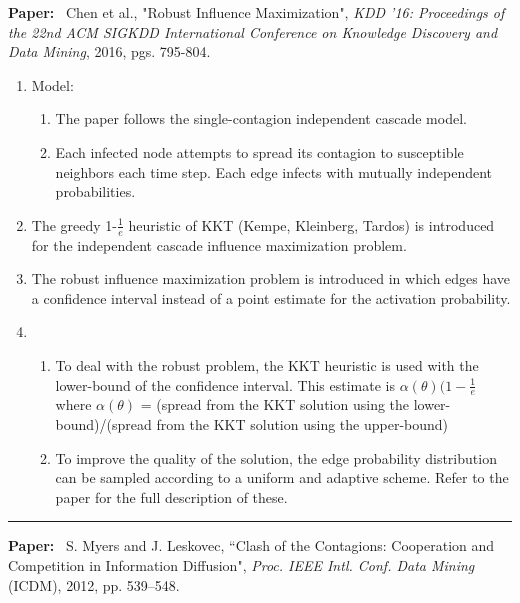 \documentclass[11pt]{article}
\begin{document}
\textbf{Paper:}~
Chen et al., "Robust Influence Maximization", \emph{KDD '16: Proceedings of the 22nd ACM SIGKDD International Conference on Knowledge Discovery and Data Mining}, 2016, pgs. 795-804.
\begin{enumerate}
    \item Model: \begin{enumerate}
        \item The paper follows the single-contagion independent cascade model.
        \item Each infected node attempts to spread its contagion to susceptible neighbors each time step. Each edge infects with mutually independent probabilities.
    \end{enumerate}
    \item The greedy 1-$\frac{1}{e}$ heuristic of KKT (Kempe, Kleinberg, Tardos) is introduced for the independent cascade influence maximization problem. 
    \item The robust influence maximization problem is introduced in which edges have a confidence interval instead of a point estimate for the activation probability.
    \item \begin{enumerate}
        \item To deal with the robust problem, the KKT heuristic is used with the lower-bound of the confidence interval. This estimate is $\alpha(\theta)(1-\frac{1}{e}$ where $\alpha(\theta)$ = (spread from the KKT solution using the lower-bound)/(spread from the KKT solution using the upper-bound)
        \item To improve the quality of the solution, the edge probability distribution can be sampled according to a uniform and adaptive scheme. Refer to the paper for the full description of these.
    \end{enumerate}
    
\end{enumerate}

\noindent
\rule{\textwidth}{0.01in}
\textbf{Paper:}~ 
S. Myers and J. Leskovec, ``Clash of the Contagions: Cooperation and
Competition in Information Diffusion", \emph{Proc. IEEE Intl. Conf. Data Mining}
(ICDM), 2012, pp. 539--548.
\end{document}
